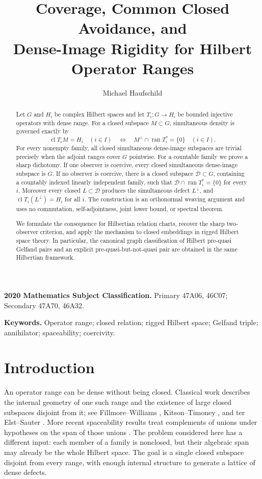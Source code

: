 \documentclass[11pt]{article}
\title{Coverage, Common Closed Avoidance, and\\
Dense-Image Rigidity for Hilbert Operator Ranges}
\author{Michael Haufschild}
\date{}
\newcommand{\ran}{\operatorname{ran}}
\newcommand{\clos}{\operatorname{cl}}
\newcommand{\cD}{\mathcal D}
\begin{document}
\maketitle

\begin{abstract}
Let \(G\) and \(H_i\) be complex Hilbert spaces and let
\(T_i:G\to H_i\) be bounded injective operators with dense range.
For a closed subspace \(M\subset G\), simultaneous density is governed exactly by
\[
  \clos{T_iM}=H_i\quad(i\in I)
  \quad\Longleftrightarrow\quad
  M^\perp\cap\ran T_i^*=\{0\}\quad(i\in I).
\]
For every nonempty family, all closed simultaneous dense-image subspaces are
trivial precisely when the adjoint ranges cover \(G\) pointwise.
For a countable family we prove a sharp dichotomy.  If one observer is
coercive, every closed simultaneous dense-image subspace is \(G\).  If no
observer is coercive, there is a closed subspace \(\cD\subset G\), containing
a countably indexed linearly independent family, such that
\(\cD\cap\ran T_i^*=\{0\}\) for every \(i\).  Moreover every closed
\(L\subset\cD\) produces the simultaneous defect \(L^\perp\), and
\(\clos{T_i(L^\perp)}=H_i\) for all \(i\).  The construction is an
orthonormal weaving argument and uses no commutation, self-adjointness, joint
lower bound, or spectral theorem.

We formulate the consequence for Hilbertian relation charts, recover the
sharp two-observer criterion, and apply the mechanism to closed embeddings
in rigged Hilbert space theory.  In particular, the canonical graph
classification of Hilbert pre-quasi Gelfand pairs and an explicit
pre-quasi-but-not-quasi pair are obtained in the same Hilbertian framework.
\end{abstract}

\medskip
\noindent\textbf{2020 Mathematics Subject Classification.}
Primary 47A06, 46C07; Secondary 47A70, 46A32.

\noindent\textbf{Keywords.}
Operator range; closed relation; rigged Hilbert space; Gelfand triple;
annihilator; spaceability; coercivity.

\section{Introduction}

An operator range can be dense without being closed.  Classical work describes
the internal geometry of one such range and the existence of large closed
subspaces disjoint from it; see Fillmore--Williams
\cite{FillmoreWilliams1971}, Kitson--Timoney \cite{KitsonTimoney2011}, and
ter Elst--Sauter \cite{TerElstSauter2016}.  More recent spaceability results
treat complements of unions under hypotheses on the span of those unions
\cite{AraujoEtAl2025}.  The problem considered here has a different input:
each member of a family is nonclosed, but their algebraic span may already be
the whole Hilbert space.  The goal is a single closed subspace disjoint from
every range, with enough internal structure to generate a lattice of dense
defects.
\end{document}
